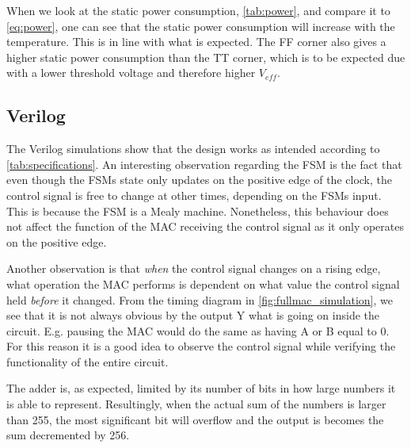 When we look at the static power consumption, \autoref{tab:power}, and compare it to \autoref{eq:power}, one can see that the static power consumption will increase with the temperature. This is in line with what is expected. The FF corner also gives a higher static power consumption than the TT corner, which is to be expected due with a lower threshold voltage and therefore higher $V_{eff}$.

\subsection{Verilog}

The Verilog simulations show that the design works as intended according to \autoref{tab:specifications}.
An interesting observation regarding the FSM is the fact that even though the FSMs state only updates on the positive edge of the clock, the control signal is free to change at other times, depending on the FSMs input. This is because the FSM is a Mealy machine. Nonetheless, this behaviour does not affect the function of the MAC receiving the control signal as it only operates on the positive edge.

Another observation is that \textit{when} the control signal changes on a rising edge, what operation the MAC performs is dependent on what value the control signal held \textit{before} it changed. From the timing diagram in \autoref{fig:fullmac_simulation}, we see that it is not always obvious by the output Y what is going on inside the circuit. E.g. pausing the MAC would do the same as having A or B equal to 0. For this reason it is a good idea to observe the control signal while verifying the functionality of the entire circuit. 

The adder is, as expected, limited by its number of bits in how large numbers it is able to represent. Resultingly, when the actual sum of the numbers is larger than 255, the most significant bit will overflow and the output is becomes the sum decremented by 256.












